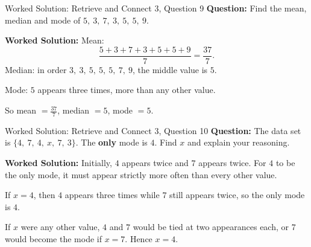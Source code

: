 \documentclass{beamer}
\begin{document}
\begin{frame}{Worked Solution: Retrieve and Connect 3, Question 9}
\small
\textbf{Question:} Find the mean, median and mode of \(5,\ 3,\ 7,\ 3,\ 5,\ 5,\ 9\).

\smallskip
\textbf{Worked Solution:} Mean:
\[
\frac{5+3+7+3+5+5+9}{7}=\frac{37}{7}.
\]
Median: in order \(3,\ 3,\ 5,\ 5,\ 5,\ 7,\ 9\), the middle value is \(5\).

Mode: \(5\) appears three times, more than any other value.

So mean \(=\frac{37}{7}\), median \(=5\), mode \(=5\).
\end{frame}

\begin{frame}{Worked Solution: Retrieve and Connect 3, Question 10}
\small
\textbf{Question:} The data set is \(\{4,\ 7,\ 4,\ x,\ 7,\ 3\}\). The \textbf{only} mode is \(4\). Find \(x\) and explain your reasoning.

\smallskip
\textbf{Worked Solution:} Initially, \(4\) appears twice and \(7\) appears twice. For \(4\) to be the only mode, it must appear strictly more often than every other value.

If \(x=4\), then \(4\) appears three times while \(7\) still appears twice, so the only mode is \(4\).

If \(x\) were any other value, \(4\) and \(7\) would be tied at two appearances each, or \(7\) would become the mode if \(x=7\). Hence \(x=4\).
\end{frame}
\end{document}
